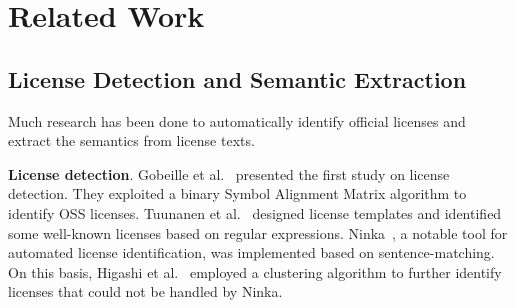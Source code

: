\section{Related Work}
\subsection{License Detection and Semantic Extraction}
Much research has been done to automatically identify official licenses and extract the semantics from license texts. 

\noindent \textbf{License detection}. %
Gobeille et al.~\cite{msr`08-Gobeille-fossology} presented the first study on license detection. They exploited a binary Symbol Alignment Matrix algorithm to identify OSS licenses.
Tuunanen et al.~\cite{ase`09-Timo-ASLA} designed license templates and identified some well-known licenses based on regular expressions. %
Ninka~\cite{ase`10-German-Ninka}, a notable tool for automated license identification, was implemented based on sentence-matching. %
On this basis, Higashi et al.~\cite{IWESEP`16-Higashi-clusteringForNinka} employed a clustering algorithm to further identify licenses that could not be handled by Ninka. %

